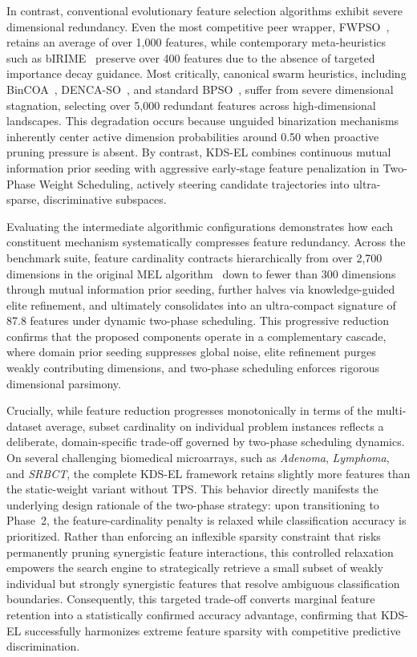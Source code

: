 

In contrast, conventional evolutionary feature selection algorithms exhibit severe dimensional redundancy. Even the most competitive peer wrapper, FWPSO~\cite{wangjia2022}, retains an average of over 1{,}000 features, while contemporary meta-heuristics such as bIRIME~\cite{su2024} preserve over 400 features due to the absence of targeted importance decay guidance. Most critically, canonical swarm heuristics, including BinCOA~\cite{shikoun2024}, DENCA-SO~\cite{hancer2023}, and standard BPSO~\cite{kennedy1997}, suffer from severe dimensional stagnation, selecting over 5{,}000 redundant features across high-dimensional landscapes. This degradation occurs because unguided binarization mechanisms inherently center active dimension probabilities around 0.50 when proactive pruning pressure is absent. By contrast, KDS-EL combines continuous mutual information prior seeding with aggressive early-stage feature penalization in Two-Phase Weight Scheduling, actively steering candidate trajectories into ultra-sparse, discriminative subspaces.

Evaluating the intermediate algorithmic configurations demonstrates how each constituent mechanism systematically compresses feature redundancy. Across the benchmark suite, feature cardinality contracts hierarchically from over 2{,}700 dimensions in the original MEL algorithm~\cite{mel2024} down to fewer than 300 dimensions through mutual information prior seeding, further halves via knowledge-guided elite refinement, and ultimately consolidates into an ultra-compact signature of 87.8 features under dynamic two-phase scheduling. This progressive reduction confirms that the proposed components operate in a complementary cascade, where domain prior seeding suppresses global noise, elite refinement purges weakly contributing dimensions, and two-phase scheduling enforces rigorous dimensional parsimony.

Crucially, while feature reduction progresses monotonically in terms of the multi-dataset average, subset cardinality on individual problem instances reflects a deliberate, domain-specific trade-off governed by two-phase scheduling dynamics. On several challenging biomedical microarrays, such as \textit{Adenoma}, \textit{Lymphoma}, and \textit{SRBCT}, the complete KDS-EL framework retains slightly more features than the static-weight variant without TPS. This behavior directly manifests the underlying design rationale of the two-phase strategy: upon transitioning to Phase~2, the feature-cardinality penalty is relaxed while classification accuracy is prioritized. Rather than enforcing an inflexible sparsity constraint that risks permanently pruning synergistic feature interactions, this controlled relaxation empowers the search engine to strategically retrieve a small subset of weakly individual but strongly synergistic features that resolve ambiguous classification boundaries. Consequently, this targeted trade-off converts marginal feature retention into a statistically confirmed accuracy advantage, confirming that KDS-EL successfully harmonizes extreme feature sparsity with competitive predictive discrimination.

